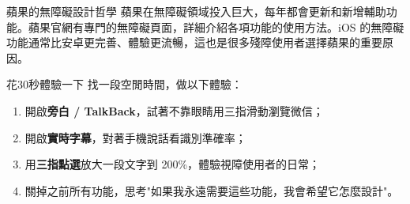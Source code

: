 \begin{tcbinfo}{蘋果的無障礙設計哲學}
蘋果在無障礙領域投入巨大，每年都會更新和新增輔助功能。蘋果官網有專門的無障礙頁面，詳細介紹各項功能的使用方法。iOS 的無障礙功能通常比安卓更完善、體驗更流暢，這也是很多殘障使用者選擇蘋果的重要原因。

\end{tcbinfo}

\begin{tcbpractice}{花30秒體驗一下}
找一段空閒時間，做以下體驗：

\begin{enumerate}
  \item 開啟\textbf{旁白 / TalkBack}，試著不靠眼睛用三指滑動瀏覽微信；
  \item 開啟\textbf{實時字幕}，對著手機說話看識別準確率；
  \item 用\textbf{三指點選}放大一段文字到 200\%，體驗視障使用者的日常；
  \item 關掉之前所有功能，思考"如果我永遠需要這些功能，我會希望它怎麼設計"。
\end{enumerate}

\end{tcbpractice}
